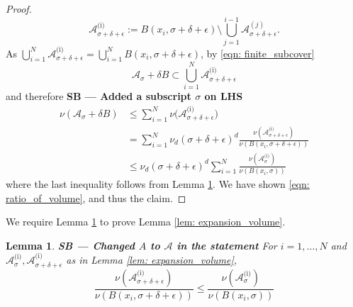 \documentclass[11pt,twoside]{article}
\newtheorem{lemma}{Lemma}
\newcommand{\1}{\mathbf{1}}
\newcommand{\Aset}{\mathcal{A}}
\newcommand{\Asig}{\Aset_{\sigma}}
\newcommand{\sbcomment}[1]{{\color{red} \bf{{{{SB --- #1}}}}}}
\begin{document}
\begin{proof}
	\begin{equation*}
	\Aset_{\sigma + \delta + \epsilon}^{\text{(i)}} := B(x_i,\sigma + \delta + \epsilon) \setminus \bigcup_{j = 1}^{i - 1} \Aset_{\sigma + \delta + \epsilon}^{(j)}. \tag{$i = 2,\ldots,N$}
	\end{equation*}
As $\bigcup_{i = 1}^{N} \Aset_{\sigma + \delta + \epsilon}^{\text{(i)}} = \bigcup_{i = 1}^{N} B(x_i,\sigma + \delta + \epsilon)$, by \eqref{eqn: finite_subcover}
	\begin{equation*}
	\Aset_{\sigma} + \delta B \subset \bigcup_{i =1}^{N} \Aset_{\sigma + \delta + \epsilon}^{\text{(i)}}
	\end{equation*}
	and therefore \sbcomment{Added a subscript $\sigma$ on LHS}
	\begin{align*}
	\nu(\Aset_\sigma + \delta B) & \leq \sum_{i = 1}^{N} \nu\bigl(\Aset_{\sigma + \delta + \epsilon}^{\text{(i)}}\bigr) \\
	& = \sum_{i = 1}^{N} \nu_d (\sigma + \delta + \epsilon)^d \frac{\nu(\Aset_{\sigma + \delta + \epsilon}^{\text{(i)}})}{\nu(B(x_i, \sigma + \delta + \epsilon))} \\
	& \leq \nu_d (\sigma + \delta + \epsilon)^d \sum_{i = 1}^{N} \frac{\nu(\Asig^{\text{(i)}})}{\nu(B(x_i,\sigma))}
	\end{align*}
	where the last inequality follows from Lemma \ref{lem: covering}. We have shown \eqref{eqn: ratio_of_volume}, and thus the claim.
\end{proof}
\noindent We require Lemma \ref{lem: covering} to prove Lemma \ref{lem: expansion_volume}.
\begin{lemma}
	\label{lem: covering}\sbcomment{Changed $A$ to $\Aset$ in the statement}
	For $i = 1, \ldots, N$ and  $\Aset_{\sigma}^{\text{(i)}}, \Aset_{\sigma + \delta + \epsilon}^{\text{(i)}}$ as in Lemma \ref{lem: expansion_volume},
	\begin{equation*}
	\frac{\nu(\Aset_{\sigma + \delta + \epsilon}^{\text{(i)}})}{\nu(B(x_i, \sigma + \delta + \epsilon))} \leq \frac{\nu(\Aset_{\sigma}^{\text{(i)}})}{\nu(B(x_i, \sigma))}
	\end{equation*}
\end{lemma}
\end{document}
